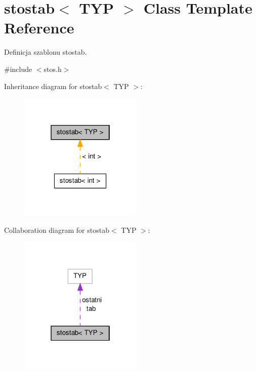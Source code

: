 \hypertarget{classstostab}{\section{stostab$<$ T\-Y\-P $>$ Class Template Reference}
\label{classstostab}
}


Definicja szablonu stostab.  




{\ttfamily \#include $<$stos.\-h$>$}



Inheritance diagram for stostab$<$ T\-Y\-P $>$\-:\nopagebreak
\begin{figure}[H]
\begin{center}
\leavevmode
\includegraphics[width=166pt]{classstostab__inherit__graph}
\end{center}
\end{figure}


Collaboration diagram for stostab$<$ T\-Y\-P $>$\-:
\nopagebreak
\begin{figure}[H]
\begin{center}
\leavevmode
\includegraphics[width=166pt]{classstostab__coll__graph}
\end{center}
\end{figure}
